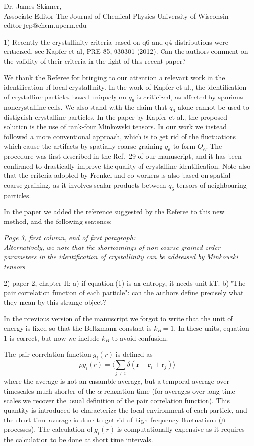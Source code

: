 \documentclass[a4paper, rebuttal, parskip=true, firsthead=false, fromemail=false, foldmarks=false]{scrlttr2}
\begin{document}
\begin{letter}{Dr. James Skinner,\\Associate Editor
The Journal of Chemical Physics
University of Wisconsin\\
editor-jcp@chem.upenn.edu }
\begin{quotationi}
1) Recently the crystallinity criteria based on q6 and q4 distributions
were criticized, see Kapfer et al, PRE 85, 030301 (2012). Can the authors
comment on the validity of their criteria in the light of this recent paper?
\end{quotationi}

We thank the Referee for bringing to our attention a relevant work in the identification of
local crystallinity. In the work of Kapfer et al., the identification of crystalline
particles based uniquely on $q_6$ is criticized, as affected by spurious noncrystalline cells.
We also stand with the claim that $q_6$ alone cannot be used to distiguish crystalline particles. In the
paper by Kapfer et al., the proposed solution is the use of rank-four Minkowski tensors. In our work
we instead followed a more conventional approach, which is to get rid of the fluctuations which
cause the artifacts by spatially coarse-graining $q_6$ to form $Q_6$. The procedure was first
described in the Ref.~29 of our manuscript, and it has been confirmed to drastically improve the
quality of crystalline identification. Note also that the criteria adopted by Frenkel and co-workers
is also based on spatial coarse-graining, as it involves scalar products between $q_6$ tensors of
neighbouring particles.

In the paper we added the reference suggested by the Referee to this new method, and the following sentence:

{\it Page 3, first column, end of first paragraph:\\
Alternatively, we note that the shortcomings of
non coarse-grained order parameters in the identification of crystallinity can be addressed by Minkowski tensors~\cite{kapfer2012jammed}
}


\begin{quotationi}
2) paper 2, chapter II: a) if equation (1) is an entropy, it needs unit kT.
b) "The pair correlation function of each particle": can the authors
define precisely what they mean by this strange object?
\end{quotationi}

In the previous version of the manuscript we forgot to write that the unit of energy is
fixed so that the Boltzmann constant is $k_B=1$. In these units, equation 1 is correct, but now we include
$k_B$ to avoid confusion.

The pair correlation function $g_i(r)$ is defined as
$$
\rho g_i(r)=\langle \sum_{j\neq i}\delta(\mathbf{r}-\mathbf{r}_i+\mathbf{r}_j)\rangle
$$
where the average is not an ensamble average, but a temporal average over timescales much shorter
of the $\alpha$ relaxation time (for averages over long time scales we recover the usual definition
of the pair correlation function). This quantity is introduced to characterize the local environment
of each particle, and the short time average is done to get rid of high-frequency fluctuations ($\beta$ processes).
The calculation of $ g_i(r)$ is computationally expensive as it requires the calculation to be done at short
time intervals.


\end{letter}
\end{document}
